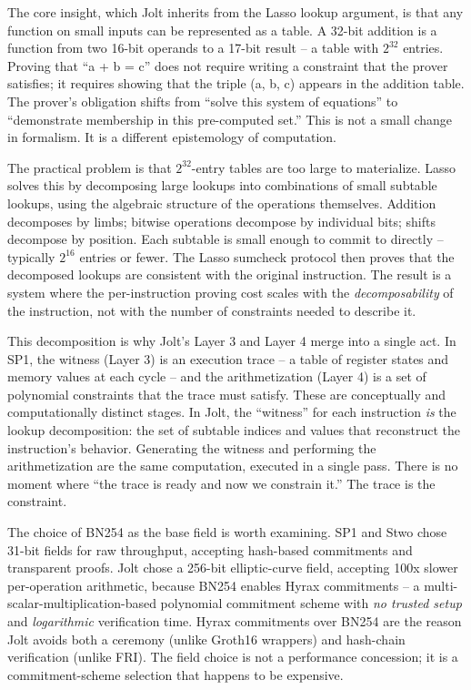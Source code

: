 \documentclass[
  11pt,
  openany]{report}
\begin{document}
The core insight, which Jolt inherits from the Lasso lookup argument, is that
any function on small inputs can be represented as a table. A 32-bit addition is
a function from two 16-bit operands to a 17-bit result -- a table with
\(2^{32}\) entries. Proving that ``a + b = c'' does not require writing a
constraint that the prover satisfies; it requires showing that the triple (a, b,
c) appears in the addition table. The prover's obligation shifts from ``solve
this system of equations'' to ``demonstrate membership in this pre-computed
set.'' This is not a small change in formalism. It is a different epistemology
of computation.

The practical problem is that \(2^{32}\)-entry tables are too large to
materialize. Lasso solves this by decomposing large lookups into combinations of
small subtable lookups, using the algebraic structure of the operations
themselves. Addition decomposes by limbs; bitwise operations decompose by
individual bits; shifts decompose by position. Each subtable is small enough to
commit to directly -- typically \(2^{16}\) entries or fewer. The Lasso sumcheck
protocol then proves that the decomposed lookups are consistent with the
original instruction. The result is a system where the per-instruction proving
cost scales with the \emph{decomposability} of the instruction, not with the
number of constraints needed to describe it.

This decomposition is why Jolt's Layer 3 and Layer 4 merge into a single act. In
SP1, the witness (Layer 3) is an execution trace -- a table of register states
and memory values at each cycle -- and the arithmetization (Layer 4) is a set of
polynomial constraints that the trace must satisfy. These are conceptually and
computationally distinct stages. In Jolt, the ``witness'' for each instruction
\emph{is} the lookup decomposition: the set of subtable indices and values that
reconstruct the instruction's behavior. Generating the witness and performing
the arithmetization are the same computation, executed in a single pass. There
is no moment where ``the trace is ready and now we constrain it.'' The trace is
the constraint.

The choice of BN254 as the base field is worth examining. SP1 and Stwo chose
31-bit fields for raw throughput, accepting hash-based commitments and
transparent proofs. Jolt chose a 256-bit elliptic-curve field, accepting 100x
slower per-operation arithmetic, because BN254 enables Hyrax commitments -- a
multi-scalar-multiplication-based polynomial commitment scheme with \emph{no
trusted setup} and \emph{logarithmic} verification time. Hyrax commitments over
BN254 are the reason Jolt avoids both a ceremony (unlike Groth16 wrappers) and
hash-chain verification (unlike FRI). The field choice is not a performance
concession; it is a commitment-scheme selection that happens to be expensive.
\end{document}
